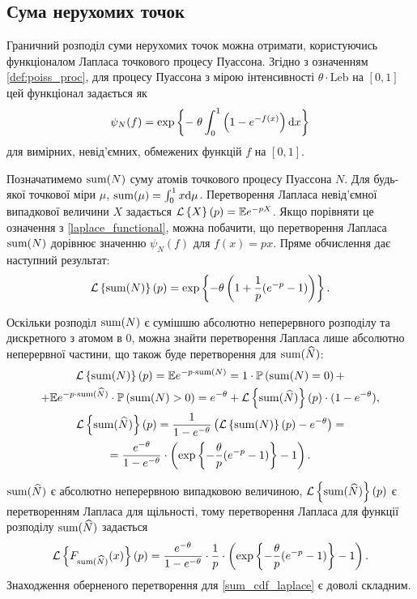 \subsection{Сума нерухомих точок}
Граничний розподіл суми нерухомих точок можна отримати, користуючись функціоналом Лапласа точкового процесу Пуассона.
Згідно з означенням \ref{def:poiss_proc}, для процесу Пуассона з мірою інтенсивності 
$\theta \cdot \mathrm{Leb}$ на $[0, 1]$ цей функціонал задається як
\begin{equation}\label{laplace_functional}
    \psi_N(f) = \exp\left\{ - \; \theta \int_0^1 \left(1 - e^{-f(x)}\right) \mathrm{d} x\right\}
\end{equation}
для вимірних, невід'ємних, обмежених функцій $f$ на $[0, 1]$.

Позначатимемо $\operatorname{sum}(N)$ суму атомів точкового процесу Пуассона $N$. 
Для будь-якої точкової міри $\mu$, 
$\operatorname{sum}(\mu) = \int_0^1 x \mathrm{d}\mu$. 
Перетворення Лапласа невід'ємної випадкової величини $X$ задається
$\mathcal{L}\left\{X\right\}(p) = \mathbb{E} e^{-pX}$. 
Якщо порівняти це означення з \eqref{laplace_functional}, можна побачити, що
перетворення Лапласа $\operatorname{sum}(N)$ дорівнює значенню $\psi_N(f)$ для $f(x) = px$.
Пряме обчислення дає наступний результат:
\begin{gather}\label{laplace_of_sum}
    \mathcal{L}\left\{\operatorname{sum}(N)\right\}(p) = 
    \exp\left\{- \theta \left( 1 + \frac{1}{p}(e^{-p} - 1)\right) \right\}.
\end{gather}

Оскільки розподіл $\operatorname{sum}(N)$ є сумішшю абсолютно неперервного розподілу та
дискретного з атомом в 0, можна знайти перетворення Лапласа
лише абсолютно неперервної частини, що також буде перетворення для
$\operatorname{sum}(\widehat{N})$:
\begin{gather}
    \mathcal{L}\left\{\operatorname{sum}(N)\right\}(p) = \mathbb{E} e^{-p\cdot\operatorname{sum}(N)} = 
    1 \cdot \mathbb{P}\left(\operatorname{sum}(N) = 0\right) + \nonumber \\ +
    \mathbb{E} e^{-p\cdot\operatorname{sum}(\widehat{N})} \cdot \mathbb{P}\left(\operatorname{sum}(N) > 0\right) =
    e^{-\theta} + \mathcal{L}\left\{\operatorname{sum}(\widehat{N})\right\}(p) \cdot (1-e^{-\theta}),
    \nonumber \\
    \mathcal{L}\left\{\operatorname{sum}(\widehat{N})\right\}(p) = \frac{1}{1 - e^{-\theta}}
    \left(\mathcal{L}\left\{\operatorname{sum}(N)\right\}(p) - e^{-\theta}\right) = \nonumber \\ =
    \label{laplace_of_sum_cont}
    \frac{e^{-\theta}}{1 - e^{-\theta}} \cdot 
    \left(\exp\left\{- \frac{\theta}{p}(e^{-p} - 1) \right\} - 1\right).
\end{gather}

$\operatorname{sum}(\widehat{N})$ є абсолютно неперервною випадковою величиною,
$\mathcal{L}\left\{\operatorname{sum}(\widehat{N})\right\}(p)$ є перетворенням Лапласа для щільності, тому
перетворення Лапласа для функції розподілу $\operatorname{sum}(\widehat{N})$
задається 
\begin{equation}\label{sum_cdf_laplace}
    \mathcal{L}\left\{F_{\operatorname{sum}(\widehat{N})}(x)\right\}(p) = 
    \frac{e^{-\theta}}{1 - e^{-\theta}} \cdot \frac{1}{p} \cdot
    \left(\exp\left\{- \frac{\theta}{p}(e^{-p} - 1) \right\} - 1\right).
\end{equation}
Знаходження оберненого перетворення для \eqref{sum_cdf_laplace}
є доволі складним.


